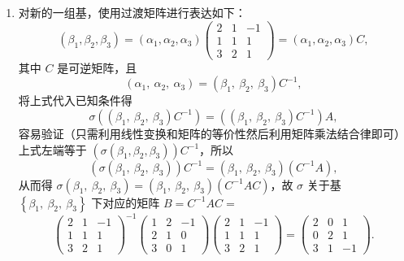\begin{solution}
    \begin{enumerate}
        \item 对新的一组基，使用过渡矩阵进行表达如下：
        \[\left(\beta_{1}, \beta_{2}, \beta_{3}\right)=\left(\alpha_{1}, \alpha_{2}, \alpha_{3}\right)\left(\begin{array}{ccc}
            2 & 1 & -1 \\
            1 & 1 & 1 \\
            3 & 2 & 1
        \end{array}\right)=\left(\alpha_{1}, \alpha_{2}, \alpha_{3}\right) C,\]
        其中 $C$ 是可逆矩阵，且
        \[\left(\alpha_{1},\ \alpha_{2},\ \alpha_{3}\right)=\left(\beta_{1},\ \beta_{2},\ \beta_{3}\right) C^{-1},\]
        将上式代入已知条件得
        \[\sigma\left(\left(\beta_{1},\ \beta_{2},\ \beta_{3}\right) C^{-1}\right)=\left(\left(\beta_{1},\ \beta_{2},\ \beta_{3}\right) C^{-1}\right) A,\]
        容易验证（只需利用线性变换和矩阵的等价性然后利用矩阵乘法结合律即可）上式左端等于 $\left(\sigma\left(\beta_{1}, \beta_{2}, \beta_{3}\right)\right) C^{-1}$，所以
        \[\left(\sigma\left(\beta_{1},\ \beta_{2},\ \beta_{3}\right)\right) C^{-1}=\left(\beta_{1},\ \beta_{2},\ \beta_{3}\right)\left(C^{-1} A\right),\]
        从而得 $\sigma\left(\beta_{1},\ \beta_{2},\ \beta_{3}\right)=\left(\beta_{1},\ \beta_{2},\ \beta_{3}\right)\left(C^{-1} A C\right)$，故 $\sigma$ 关于基 $\left\{\beta_{1},\ \beta_{2},\ \beta_{3}\right\}$ 下对应的矩阵 $B=C^{-1} A C=$
        \[\left(\begin{array}{ccc}
            2 & 1 & -1 \\
            1 & 1 & 1 \\
            3 & 2 & 1
            \end{array}\right)^{-1}\left(\begin{array}{ccc}
            1 & 2 & -1 \\
            2 & 1 & 0 \\
            3 & 0 & 1
            \end{array}\right)\left(\begin{array}{ccc}
            2 & 1 & -1 \\
            1 & 1 & 1 \\
            3 & 2 & 1
            \end{array}\right)=\left(\begin{array}{ccc}
            2 & 0 & 1 \\
            0 & 2 & 1 \\
            3 & 1 & -1
            \end{array}\right).\]


\end{enumerate}
\end{solution}
